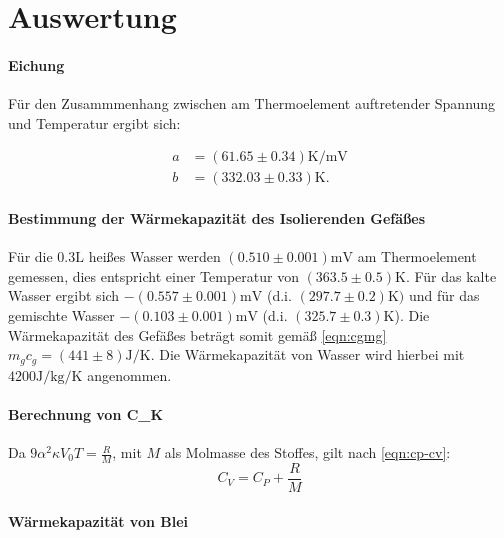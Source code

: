 \section{Auswertung}
\label{sec:Auswertung}
\paragraph{Eichung}
Für den Zusammmenhang zwischen am Thermoelement auftretender Spannung und Temperatur ergibt sich:

\begin{align*}
  a &= \left(61.65 \pm 0.34 \right) \si{\kelvin \per \milli \volt} \\
  b &= \left(332.03 \pm 0.33 \right) \si{\kelvin}.
\end{align*}

\paragraph{Bestimmung der Wärmekapazität des Isolierenden Gefäßes}
Für die $0.3 \si{\liter}$ heißes Wasser werden $(0.510 \pm 0.001) \si{\milli \volt}$ am Thermoelement gemessen, dies entspricht einer Temperatur von $(363.5 \pm 0.5) \si{\kelvin}$. Für das kalte Wasser ergibt sich $-(0.557 \pm 0.001)\si{\milli \volt}$ (d.i. $(297.7 \pm 0.2) \si{\kelvin})$ und für das gemischte Wasser  $-(0.103 \pm 0.001)\si{\milli\volt}$ (d.i. $(325.7 \pm 0.3) \si{\kelvin}$). Die Wärmekapazität des Gefäßes beträgt somit gemäß \eqref{eqn:cgmg} $m_gc_g = (441 \pm 8) \si{\joule \per \kelvin}$. Die Wärmekapazität von Wasser wird hierbei mit $4200 \si{\joule \per \kilo \gram \per \kelvin}$ \cite{Stoffwerte} angenommen.

\paragraph{Berechnung von C_K}
Da $9 \alpha^2 \kappa V_0 T = \frac{R}{M}$, mit $M$ als Molmasse des Stoffes, gilt nach \eqref{eqn:cp-cv}:
\begin{equation}
  C_V = C_P + \frac{R}{M}
  \label{eqn:cr}
\end{equation}

\paragraph{Wärmekapazität von Blei}

